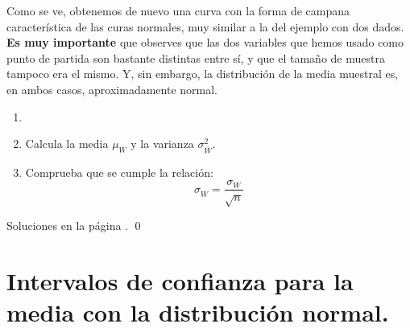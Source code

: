 \documentclass[10pt,a4paper]{article}\usepackage[]{graphicx}\usepackage[]{color}
\begin{document}
Como se ve, obtenemos de nuevo una  curva con la forma de campana característica de las curas normales, muy similar a la del ejemplo con dos dados. {\bf Es muy importante} que observes que las dos variables que hemos usado como punto de partida son bastante distintas entre sí, y que el tamaño de muestra tampoco era el mismo. Y, sin embargo, la distribución de la media muestral es, en ambos casos, aproximadamente normal.

\begin{ejercicio}
\label{tut06:ejercicio04}
\begin{enumerate}
  \item[]
  \item Calcula la media $\mu_{\bar W}$ y la varianza $\sigma^2_{\bar W}$.
  \item Comprueba que se cumple la relación:
  \[\sigma_{\bar W}=\dfrac{\sigma_W}{\sqrt{n}}\]
\end{enumerate}
Soluciones en la página \pageref{tut06:ejercicio04:sol}.
\qed
\end{ejercicio}


\section{Intervalos de confianza para la media con la distribución normal.}
\label{tut06:sec:IntervalosConfianzaMediaNormal}
\end{document}
